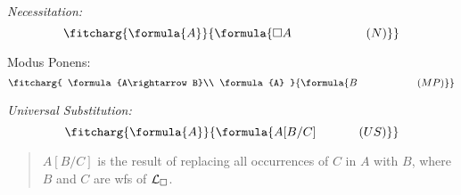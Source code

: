 \documentclass[a4paper, 11pt]{article} %
\begin{document}
	
\begin{multicols}{2}\it
Necessitation:\vspace{-.05in}
\begin{equation*}
\fitcharg{
\formula{A}
}{
\formula{\Box A \hspace*{.83in}(N)}
}
\end{equation*}

Modus Ponens:\vspace{-.05in}
\begin{equation*}
\fitcharg{
\formula{A\rightarrow B}\\
\formula{A}
}{
\formula{B \hspace*{.8in}(MP)}
}
\end{equation*}
\end{multicols}
\vspace{-.2in}


\begin{multicols}{2}\it
Universal Substitution:\vspace{-.05in}
\begin{equation*}
\fitcharg{
\formula{A}
}{
\formula{A[B/C] \hspace*{.477in}(US)}
}
\end{equation*}

\vspace*{-.07in}

\begin{quote}\small
$A[B/C]$ is the result of replacing all occurrences of $C$ in $A$ with $B$, where $B$ and $C$ are wfs of $\mathcal{L}_\square$.
\end{quote}

\end{multicols}
\vspace{-.05in}
	
\end{document}

